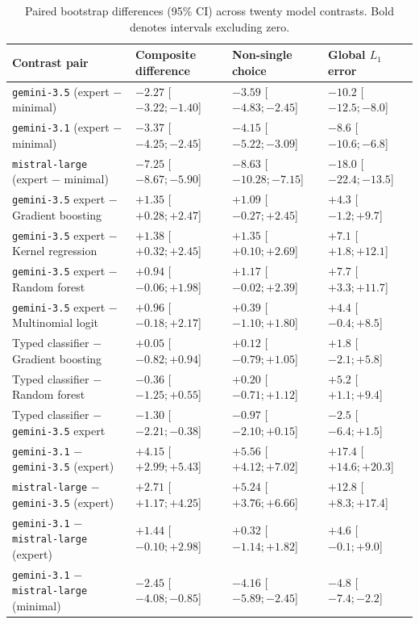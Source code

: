 \begin{table}[t]
\centering
\caption{Paired bootstrap differences (95\% CI) across twenty model contrasts. Bold denotes intervals excluding zero.}
\label{tab-twenty_contrasts}
\small
\begin{tabularx}{\textwidth}{lXXX}
\toprule
\textbf{Contrast pair} & \textbf{Composite difference} & \textbf{Non-single choice} & \textbf{Global $L_1$ error} \\
\midrule
\texttt{gemini-3.5} (expert $-$ minimal) & \textbf{$-2.27$} [$-3.22; -1.40$] & \textbf{$-3.59$} [$-4.83; -2.45$] & \textbf{$-10.2$} [$-12.5; -8.0$] \\
\texttt{gemini-3.1} (expert $-$ minimal) & \textbf{$-3.37$} [$-4.25; -2.45$] & \textbf{$-4.15$} [$-5.22; -3.09$] & \textbf{$-8.6$} [$-10.6; -6.8$] \\
\texttt{mistral-large} (expert $-$ minimal) & \textbf{$-7.25$} [$-8.67; -5.90$] & \textbf{$-8.63$} [$-10.28; -7.15$] & \textbf{$-18.0$} [$-22.4; -13.5$] \\
\texttt{gemini-3.5} expert $-$ Gradient boosting & \textbf{$+1.35$} [$+0.28; +2.47$] & $+1.09$ [$-0.27; +2.45$] & $+4.3$ [$-1.2; +9.7$] \\
\texttt{gemini-3.5} expert $-$ Kernel regression & \textbf{$+1.38$} [$+0.32; +2.45$] & \textbf{$+1.35$} [$+0.10; +2.69$] & \textbf{$+7.1$} [$+1.8; +12.1$] \\
\texttt{gemini-3.5} expert $-$ Random forest & $+0.94$ [$-0.06; +1.98$] & $+1.17$ [$-0.02; +2.39$] & \textbf{$+7.7$} [$+3.3; +11.7$] \\
\texttt{gemini-3.5} expert $-$ Multinomial logit & $+0.96$ [$-0.18; +2.17$] & $+0.39$ [$-1.10; +1.80$] & $+4.4$ [$-0.4; +8.5$] \\
Typed classifier $-$ Gradient boosting & $+0.05$ [$-0.82; +0.94$] & $+0.12$ [$-0.79; +1.05$] & $+1.8$ [$-2.1; +5.8$] \\
Typed classifier $-$ Random forest & $-0.36$ [$-1.25; +0.55$] & $+0.20$ [$-0.71; +1.12$] & $+5.2$ [$+1.1; +9.4$] \\
Typed classifier $-$ \texttt{gemini-3.5} expert & \textbf{$-1.30$} [$-2.21; -0.38$] & $-0.97$ [$-2.10; +0.15$] & $-2.5$ [$-6.4; +1.5$] \\
\texttt{gemini-3.1} $-$ \texttt{gemini-3.5} (expert) & \textbf{$+4.15$} [$+2.99; +5.43$] & \textbf{$+5.56$} [$+4.12; +7.02$] & \textbf{$+17.4$} [$+14.6; +20.3$] \\
\texttt{mistral-large} $-$ \texttt{gemini-3.5} (expert) & \textbf{$+2.71$} [$+1.17; +4.25$] & \textbf{$+5.24$} [$+3.76; +6.66$] & \textbf{$+12.8$} [$+8.3; +17.4$] \\
\texttt{gemini-3.1} $-$ \texttt{mistral-large} (expert) & $+1.44$ [$-0.10; +2.98$] & $+0.32$ [$-1.14; +1.82$] & $+4.6$ [$-0.1; +9.0$] \\
\texttt{gemini-3.1} $-$ \texttt{mistral-large} (minimal) & \textbf{$-2.45$} [$-4.08; -0.85$] & \textbf{$-4.16$} [$-5.89; -2.45$] & \textbf{$-4.8$} [$-7.4; -2.2$] \\
\bottomrule
\end{tabularx}
\end{table}

